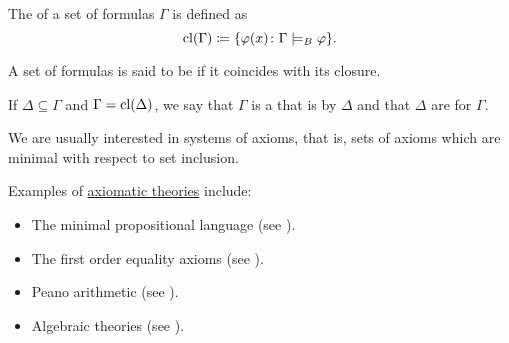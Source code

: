 \begin{definition}\label{def:propositional_theory}
  The  of a set of formulas \( \Gamma \) is defined as
  \begin{equation*}
    \operatorname{cl}(\Gamma) \coloneqq \{ \varphi(x) \colon \Gamma \models_B \varphi \}.
  \end{equation*}

  A set of formulas is said to be  if it coincides with its closure.

  If \( \Delta \subseteq \Gamma \) and \( \Gamma = \operatorname{cl}(\Delta) \), we say that \( \Gamma \) is a  that is  by \( \Delta \) and that \( \Delta \) are  for \( \Gamma \).

  We are usually interested in  systems of axioms, that is, sets of axioms which are minimal with respect to set inclusion.
\end{definition}

\begin{example}\label{ex:axiomatic_theory}
  Examples of \hyperref[def:propositional_theory]{axiomatic theories} include:
  \begin{itemize}
    \item The minimal propositional language (see ).
    \item The first order equality axioms (see ).
    \item Peano arithmetic (see ).
    \item Algebraic theories (see ).
  \end{itemize}
\end{example}

